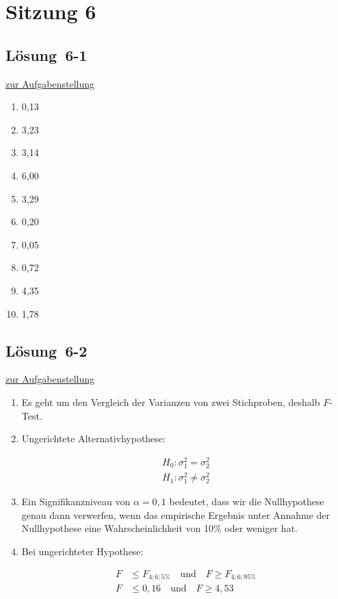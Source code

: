 \documentclass[
  11pt,
  ngerman,
  a4paper,
]{report}
\providecommand{\tightlist}{%
  \setlength{\itemsep}{0pt}\setlength{\parskip}{0pt}}
\begin{document}
\hypertarget{sitzung-6}{%
\section*{Sitzung 6}\label{sitzung-6}}

\hypertarget{loesung-6-1}{%
\subsection{Lösung~6-1}\label{loesung-6-1}}

\protect\hyperlink{aufgabe-6-1}{zur Aufgabenstellung}

\begin{enumerate}
\def\labelenumi{\alph{enumi})}
\tightlist
\item
  0,13
\item
  3,23
\item
  3,14
\item
  6,00
\item
  3,29
\item
  0,20
\item
  0,05
\item
  0,72
\item
  4,35
\item
  1,78
\end{enumerate}

\hypertarget{loesung-6-2}{%
\subsection{Lösung~6-2}\label{loesung-6-2}}

\protect\hyperlink{aufgabe-6-2}{zur Aufgabenstellung}

\begin{enumerate}
\def\labelenumi{\alph{enumi})}
\item
  Es geht um den Vergleich der Varianzen von zwei Stichproben, deshalb \(F\)-Test.
\item
  Ungerichtete Alternativhypothese:

  \[\begin{aligned}
   H_0: \sigma^2_1 = \sigma^2_2\\[5pt]
   H_1: \sigma^2_1 \neq \sigma^2_2
   \end{aligned}\]
\item
  Ein Signifikanzniveau von \(\alpha=0{,}1\) bedeutet, dass wir die Nullhypothese genau dann verwerfen, wenn das empirische Ergebnis unter Annahme der Nullhypothese eine Wahrscheinlichkeit von 10\% oder weniger hat.
\item
  Bei ungerichteter Hypothese:

  \[\begin{aligned}
   F &\leq F_{4;6;5\%}\quad \textrm{und} \quad F\geq F_{4;6;95\%}\\[4pt]
   F &\leq 0{,}16 \quad \textrm{und} \quad F\geq 4{,}53
   \end{aligned}\]
\end{enumerate}
\end{document}
